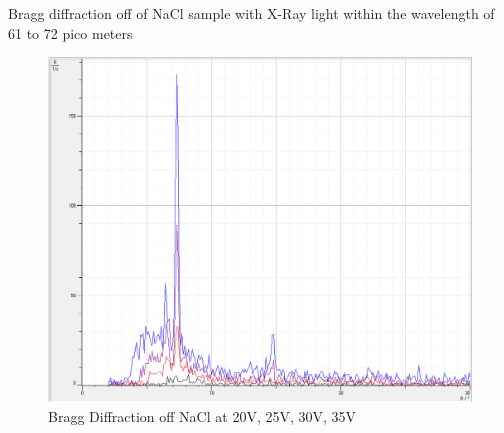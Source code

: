 \documentclass{amsart}
\begin{document}
\centering
Bragg diffraction off of NaCl sample with X-Ray light within the wavelength of 61 to 72 pico meters

\begin{figure}[H]
        \centering
        \includegraphics[width=\textwidth]{NaCl_all.PNG}
        \caption{Bragg Diffraction off NaCl at 20V, 25V, 30V, 35V}
\end{figure}
\end{document}
